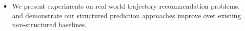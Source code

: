 \begin{itemize}[noitemsep,leftmargin=12pt]
	\item We present experiments on real-world trajectory recommendation problems, and demonstrate our structured prediction approaches improve over existing non-structured baselines. %
\end{itemize}

